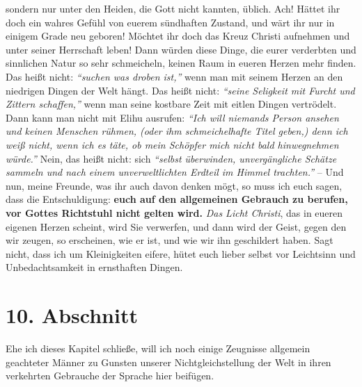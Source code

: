 sondern nur unter den Heiden, die
Gott nicht kannten, üblich. Ach! Hättet ihr doch ein wahres Gefühl von euerem
sündhaften Zustand, und wärt ihr nur in einigem
Grade neu geboren! Möchtet ihr
doch das Kreuz Christi aufnehmen und unter seiner
Herrschaft leben! Dann würden
diese Dinge, die eurer verderbten und sinnlichen
Natur so sehr schmeicheln,
keinen Raum in eueren Herzen mehr finden. Das heißt nicht:
\textit{"`suchen was droben ist,"'}
wenn man mit seinem Herzen an den niedrigen Dingen der Welt hängt. Das
heißt nicht:
\textit{"`seine Seligkeit mit Furcht und Zittern schaffen,"'} wenn man
seine kostbare Zeit mit eitlen Dingen vertrödelt. Dann kann man nicht mit
Elihu
ausrufen:
\textit{"`Ich will niemands Person ansehen und keinen Menschen rühmen, (oder
ihm schmeichelhafte Titel geben,) denn ich weiß nicht, wenn ich es täte, ob
mein Schöpfer mich nicht bald hinwegnehmen würde."'}
Nein, das heißt nicht: sich
\textit{"`selbst überwinden, unvergängliche
Schätze sammeln und nach einem
unverweltlichten Erdteil im Himmel trachten."'} -- Und nun, meine Freunde, was
ihr auch davon denken mögt, so muss ich euch sagen, dass die Entschuldigung:
\textbf{euch
auf den allgemeinen Gebrauch zu berufen, vor Gottes Richtstuhl nicht gelten
wird.} \textit{Das Licht Christi}, das in eueren eigenen Herzen
scheint, wird Sie
verwerfen, und dann wird der Geist, gegen den wir zeugen, so erscheinen, wie er
ist, und wie wir ihn geschildert haben. Sagt nicht, dass ich um Kleinigkeiten
eifere, hütet euch lieber selbst vor Leichtsinn und Unbedachtsamkeit in
ernsthaften Dingen.

\section{10. Abschnitt} \label{kap10_ab10}

Ehe ich dieses Kapitel schließe, will ich noch einige Zeugnisse allgemein
geachteter Männer zu Gunsten unserer Nichtgleichstellung der Welt in ihren
verkehrten Gebrauche der Sprache hier beifügen.

\medskip

